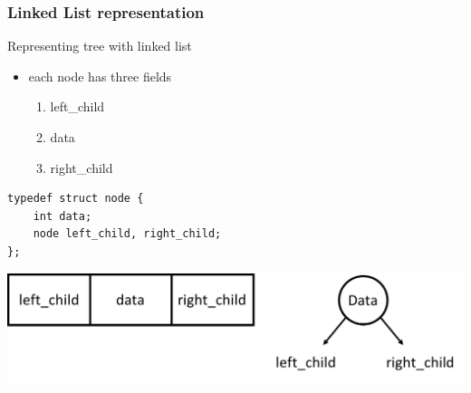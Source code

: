 \documentclass[newPxFont,sthlmFooter,nooffset]{beamer}
\begin{document}
\begin{frame}[t, fragile]
  \frametitle{Linked List representation}
Representing tree with linked list
\begin{itemize}
\item each node has three fields
  \begin{enumerate}
  \item left\_child
  \item data
  \item right\_child
  \end{enumerate}
\end{itemize}

\begin{lstlisting}
typedef struct node {
    int data;
    node left_child, right_child;
};
\end{lstlisting}
\begin{center}
        \includegraphics[height=0.2\textheight]{figures/fig08_linked_list.png}
\end{center}
\end{frame}
\end{document}
